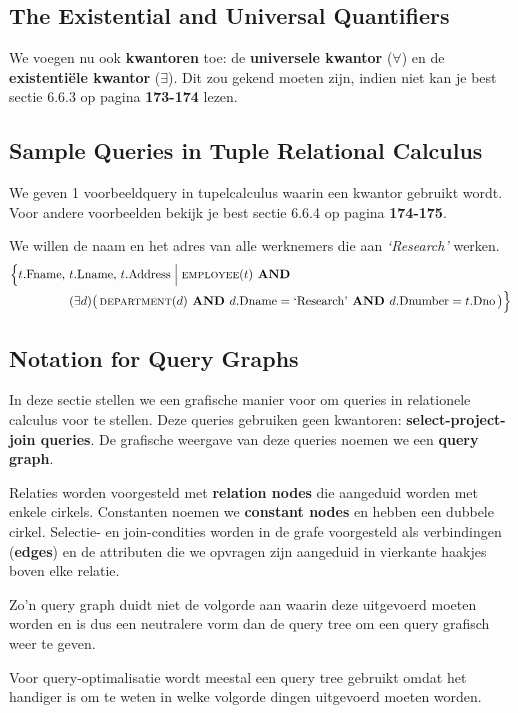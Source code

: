 \subsection{The Existential and Universal Quantifiers}
We voegen nu ook \textbf{kwantoren} toe: de \textbf{universele kwantor} ($\forall$) en de \textbf{existenti\"ele kwantor} ($\exists$). Dit zou gekend moeten zijn, indien niet kan je best sectie 6.6.3 op pagina \textbf{173-174} lezen.


\subsection{Sample Queries in Tuple Relational Calculus}
We geven 1 voorbeeldquery in tupelcalculus waarin een kwantor gebruikt wordt. Voor andere voorbeelden bekijk je best sectie 6.6.4 op pagina \textbf{174-175}.

We willen de naam en het adres van alle werknemers die aan \textit{`Research'} werken.
\vspace{-2mm}
\begin{align*}
\Big\{ t.\text{Fname, } &t.\text{Lname, } t.\text{Address} \Bigm| \textsc{employee}(t) \textbf{ AND } \\
&(\exists d) \big(\, \textsc{department}(d) \textbf{ AND } d.\text{Dname} = \text{`Research'} \textbf{ AND } d.\text{Dnumber} = t.\text{Dno} \,\big) \Big\}
\end{align*}


\subsection{Notation for Query Graphs}
In deze sectie stellen we een grafische manier voor om queries in relationele calculus voor te stellen. Deze queries gebruiken geen kwantoren: \textbf{select-project-join queries}. De grafische weergave van deze queries noemen we een \textbf{query graph}.

Relaties worden voorgesteld met \textbf{relation nodes} die aangeduid worden met enkele cirkels. Constanten noemen we \textbf{constant nodes} en hebben een dubbele cirkel. Selectie- en join-condities worden in de grafe voorgesteld als verbindingen (\textbf{edges}) en de attributen die we opvragen zijn aangeduid in vierkante haakjes boven elke relatie.

Zo'n query graph duidt niet de volgorde aan waarin deze uitgevoerd moeten worden en is dus een neutralere vorm dan de query tree om een query grafisch weer te geven.

Voor query-optimalisatie wordt meestal een query tree gebruikt omdat het handiger is om te weten in welke volgorde dingen uitgevoerd moeten worden.

